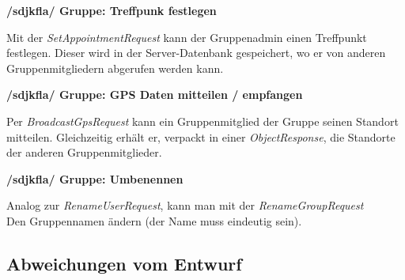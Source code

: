 \textbf{/sdjkfla/ Gruppe: Treffpunk festlegen}

Mit der \textit{SetAppointmentRequest} kann der Gruppenadmin einen Treffpunkt festlegen.
Dieser wird in der Server-Datenbank gespeichert, wo er von anderen Gruppenmitgliedern
abgerufen werden kann.


\textbf{/sdjkfla/ Gruppe: GPS Daten mitteilen / empfangen}

Per \textit{BroadcastGpsRequest} kann ein Gruppenmitglied der Gruppe seinen Standort
mitteilen. Gleichzeitig erhält er, verpackt in einer \textit{ObjectResponse},
die Standorte der anderen Gruppenmitglieder.

\textbf{/sdjkfla/ Gruppe: Umbenennen}

Analog zur \textit{RenameUserRequest}, kann man mit der \textit{RenameGroupRequest}\\
Den Gruppennamen ändern (der Name muss eindeutig sein).

\subsection{Abweichungen vom Entwurf}



